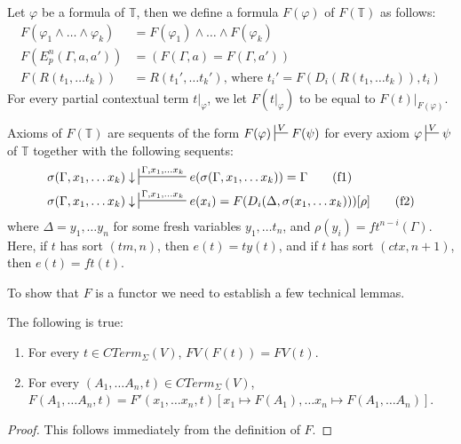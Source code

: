 \documentclass[reqno]{amsart}
\newcommand{\axtag}[1]{\label{ax:#1} \tag{#1}}
\theoremstyle{definition}
\theoremstyle{remark}
\numberwithin{figure}{section}
\begin{document}
Let $\varphi$ be a formula of $\mathbb{T}$, then we define a formula $F(\varphi)$ of $F(\mathbb{T})$ as follows:
\begin{align*}
F(\varphi_1 \land \ldots \land \varphi_k) & = F(\varphi_1) \land \ldots \land F(\varphi_k) \\
F(E^n_p(\Gamma, a, a')) & = (F(\Gamma, a) = F(\Gamma, a')) \\
F(R(t_1, \ldots t_k)) & = R(t_1', \ldots t_k') \text{, where $t_i' = F(D_i(R(t_1, \ldots t_k)), t_i)$}
\end{align*}
For every partial contextual term $t|_\varphi$, we let $F(t|_\varphi)$ to be equal to $F(t)|_{F(\varphi)}$.

Axioms of $F(\mathbb{T})$ are sequents of the form $F(\varphi) \sststile{}{V} F(\psi)$ for every axiom $\varphi \sststile{}{V} \psi$ of $\mathbb{T}$ together with the following sequents:
\begin{align*}
\sigma(\Gamma, x_1, \ldots x_k) \downarrow & \sststile{}{\Gamma, x_1, \ldots x_k} e(\sigma(\Gamma, x_1, \ldots x_k)) = \Gamma \axtag{f1} \\
\sigma(\Gamma, x_1, \ldots x_k) \downarrow & \sststile{}{\Gamma, x_1, \ldots x_k} e(x_i) = F(D_i(\Delta, \sigma(x_1, \ldots x_k)))[\rho] \axtag{f2}
\end{align*}
where $\Delta = y_1, \ldots y_n$ for some fresh variables $y_1, \ldots t_n$, and $\rho(y_i) = ft^{n-i}(\Gamma)$.
Here, if $t$ has sort $(tm,n)$, then $e(t) = ty(t)$, and if $t$ has sort $(ctx,n+1)$, then $e(t) = ft(t)$.

To show that $F$ is a functor we need to establish a few technical lemmas.

\begin{lem}[F-basic]
The following is true:
\begin{enumerate}
\item \label{F-FV}
For every $t \in CTerm_\Sigma(V)$, $FV(F(t)) = FV(t)$.
\item \label{F-F'}
For every $(A_1, \ldots A_n, t) \in CTerm_\Sigma(V)$, $F(A_1, \ldots A_n, t) = F'(x_1, \ldots x_n, t) \allowbreak [x_1 \mapsto F(A_1), \ldots x_n \mapsto F(A_1, \ldots A_n)]$.
\end{enumerate}
\end{lem}
\begin{proof}
This follows immediately from the definition of $F$.
\end{proof}
\end{document}
